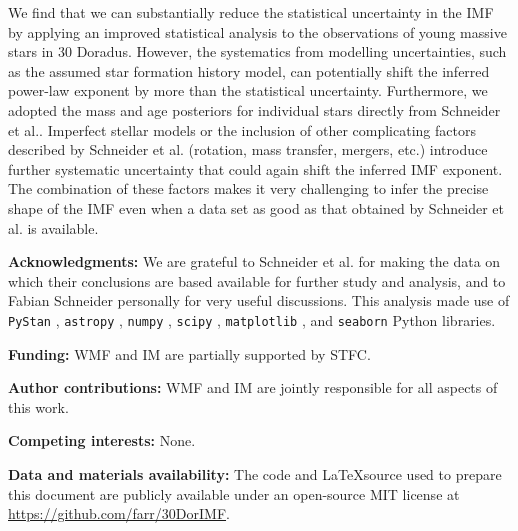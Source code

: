 \documentclass[12pt]{article}
\begin{document}
We find that we can substantially reduce the statistical uncertainty in the IMF by applying an improved statistical analysis to the observations of young massive stars in 30 Doradus.  However, the systematics from modelling uncertainties, such as the assumed star formation history model, can potentially shift the inferred power-law exponent by more than the statistical uncertainty.   Furthermore, we adopted the mass and age posteriors for individual stars directly from Schneider et al.\cite{Schneider:2018}.  Imperfect stellar models or the inclusion of other complicating factors described by Schneider et al.\cite{Schneider:2018} (rotation, mass transfer, mergers, etc.) introduce further systematic uncertainty that could again shift the inferred IMF exponent.
The combination of these factors makes it very challenging to infer the precise shape of the IMF even when a data set as good as that obtained by Schneider et al.\cite{Schneider:2018} is available.



{\bf Acknowledgments:} We are grateful to Schneider et al.\cite{Schneider:2018} for making the data on which their conclusions are based available for further study and analysis, and to Fabian Schneider personally for very useful discussions.  This analysis made use of \texttt{PyStan} \cite{STAN}, \texttt{astropy} \cite{astropy}, \texttt{numpy} \cite{numpy}, \texttt{scipy} \cite{scipy}, \texttt{matplotlib} \cite{matplotlib}, and \texttt{seaborn} \cite{seaborn} Python libraries.

{\bf Funding:} WMF and IM are partially supported by STFC.

{\bf Author contributions:} WMF and IM are jointly responsible for all aspects of this work.

{\bf Competing interests:} None.

{\bf Data and materials availability:} The code and \LaTeX source used to prepare this document are publicly available under an open-source MIT license at \url{https://github.com/farr/30DorIMF}.




\end{document}
